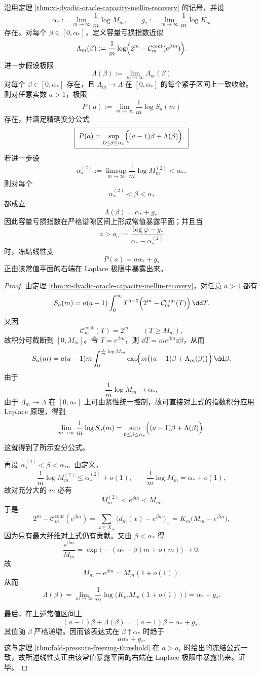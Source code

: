 \begin{theorem}\label{thm:xi-capacity-defect-exponent-mellin-laplace-face}
沿用定理 \ref{thm:xi-dyadic-oracle-capacity-mellin-recovery} 的记号，并设
\[
\alpha_*:=\lim_{m\to\infty}\frac{1}{m}\log M_m,
\qquad
g_*:=\lim_{m\to\infty}\frac{1}{m}\log K_m
\]
存在。对每个 \(\beta\in[0,\alpha_*]\)，定义容量亏损指数近似
\[
\Lambda_m(\beta):=
\frac{1}{m}\log\Bigl(2^m-\mathcal C_m^{\mathrm{cont}}(e^{\beta m})\Bigr).
\]
进一步假设极限
\[
\Lambda(\beta):=\lim_{m\to\infty}\Lambda_m(\beta)
\]
对每个 \(\beta\in[0,\alpha_*]\) 存在，且 \(\Lambda_m\to\Lambda\) 在 \([0,\alpha_*]\) 的每个紧子区间上一致收敛。则对任意实数 \(a>1\)，极限
\[
P(a):=\lim_{m\to\infty}\frac{1}{m}\log S_a(m)
\]
存在，并满足精确变分公式
\[
\boxed{\;
P(a)=\sup_{0\le \beta\le \alpha_*}\Bigl((a-1)\beta+\Lambda(\beta)\Bigr).\;}
\]
若进一步设
\[
\alpha_*^{(2)}:=\limsup_{m\to\infty}\frac{1}{m}\log M_m^{(2)}<\alpha_*,
\]
则对每个
\[
\alpha_*^{(2)}<\beta<\alpha_*
\]
都成立
\[
\boxed{\;
\Lambda(\beta)=\alpha_*+g_*.\;}
\]
因此容量亏损指数在严格谱隙区间上形成常值暴露平面；并且当
\[
a>a_{\mathrm c}:=\frac{\log\varphi-g_*}{\alpha_*-\alpha_*^{(2)}}
\]
时，冻结线性支
\[
P(a)=a\alpha_*+g_*
\]
正由该常值平面的右端在 Laplace 极限中暴露出来。
\end{theorem}
\begin{proof}
由定理 \ref{thm:xi-dyadic-oracle-capacity-mellin-recovery}，对任意 \(a>1\) 都有
\[
S_a(m)
=
a(a-1)\int_0^\infty T^{a-2}\Bigl(2^m-\mathcal C_m^{\mathrm{cont}}(T)\Bigr)\,\dd T.
\]
又因
\[
\mathcal C_m^{\mathrm{cont}}(T)=2^m
\qquad (T\ge M_m),
\]
故积分可截断到 \([0,M_m]\)。令 \(T=e^{\beta m}\)，则 \(\dd T=me^{\beta m}\dd\beta\)，从而
\[
S_a(m)
=
a(a-1)m
\int_0^{\frac1m\log M_m}
\exp\!\Bigl(
m\bigl((a-1)\beta+\Lambda_m(\beta)\bigr)
\Bigr)\,\dd\beta.
\]
由于
\[
\frac1m\log M_m\to \alpha_*,
\]
由于 \(\Lambda_m\to\Lambda\) 在 \([0,\alpha_*]\) 上可由紧性统一控制，故可直接对上式的指数积分应用 Laplace 原理，得到
\[
\lim_{m\to\infty}\frac1m\log S_a(m)
=
\sup_{0\le \beta\le \alpha_*}
\Bigl((a-1)\beta+\Lambda(\beta)\Bigr).
\]
这就得到了所示变分公式。

再设 \(\alpha_*^{(2)}<\beta<\alpha_*\)。由定义，
\[
\frac1m\log M_m^{(2)}\le \alpha_*^{(2)}+o(1),
\qquad
\frac1m\log M_m=\alpha_*+o(1),
\]
故对充分大的 \(m\) 必有
\[
M_m^{(2)}<e^{\beta m}<M_m.
\]
于是
\[
2^m-\mathcal C_m^{\mathrm{cont}}(e^{\beta m})
=
\sum_{x\in X_m}\bigl(d_m(x)-e^{\beta m}\bigr)_+
=
K_m\bigl(M_m-e^{\beta m}\bigr),
\]
因为只有最大纤维对上式仍有贡献。又由 \(\beta<\alpha_*\) 得
\[
\frac{e^{\beta m}}{M_m}
=
\exp\!\bigl(-(\alpha_*-\beta)m+o(m)\bigr)\to 0,
\]
故
\[
M_m-e^{\beta m}=M_m(1+o(1)).
\]
从而
\[
\Lambda(\beta)
=
\lim_{m\to\infty}\frac1m\log\bigl(K_mM_m(1+o(1))\bigr)
=
\alpha_*+g_*.
\]

最后，在上述常值区间上
\[
(a-1)\beta+\Lambda(\beta)
=
(a-1)\beta+\alpha_*+g_*,
\]
其值随 \(\beta\) 严格递增。因而该表达式在
\(
\beta\uparrow \alpha_*
\)
时趋于
\[
a\alpha_*+g_*.
\]
这与定理 \ref{thm:fold-pressure-freezing-threshold} 在 \(a>a_{\mathrm c}\) 时给出的冻结公式一致，故所述线性支正由该常值暴露平面的右端在 Laplace 极限中暴露出来。证毕。
\end{proof}

\endinput
